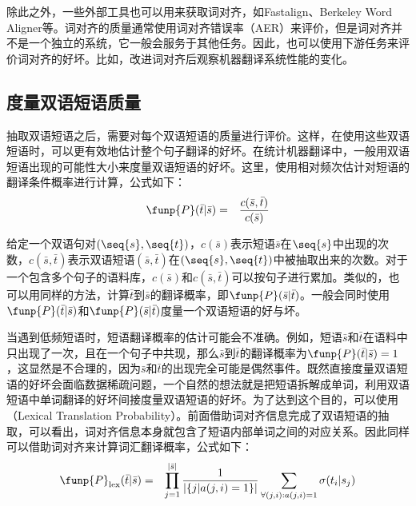 \parinterval 除此之外，一些外部工具也可以用来获取词对齐，如Fastalign、Berkeley Word Aligner等。词对齐的质量通常使用词对齐错误率（AER）来评价，但是词对齐并不是一个独立的系统，它一般会服务于其他任务。因此，也可以使用下游任务来评价词对齐的好坏。比如，改进词对齐后观察机器翻译系统性能的变化。


\subsection{度量双语短语质量}

\parinterval 抽取双语短语之后，需要对每个双语短语的质量进行评价。这样，在使用这些双语短语时，可以更有效地估计整个句子翻译的好坏。在统计机器翻译中，一般用双语短语出现的可能性大小来度量双语短语的好坏。这里，使用相对频次估计对短语的翻译条件概率进行计算，公式如下：
\begin{eqnarray}
\funp{P}(\bar{t}|\bar{s}) & = & \frac{c(\bar{s},\bar{t})}{c(\bar{s})}
\label{eq:7-13}
\end{eqnarray}

\parinterval 给定一个双语句对$(\seq{s},\seq{t})$，$c(\bar{s})$表示短语$\bar{s}$在$\seq{s}$中出现的次数，$c(\bar{s},\bar{t})$表示双语短语$(\bar{s},\bar{t})$在$(\seq{s},\seq{t})$中被抽取出来的次数。对于一个包含多个句子的语料库，$c(\bar{s})$和$c(\bar{s},\bar{t})$可以按句子进行累加。类似的，也可以用同样的方法，计算$\bar{t}$到$\bar{s}$的翻译概率，即$\funp{P}(\bar{s}|\bar{t})$。一般会同时使用$\funp{P}(\bar{t}|\bar{s})$和$\funp{P}(\bar{s}|\bar{t})$度量一个双语短语的好与坏。

\parinterval 当遇到低频短语时，短语翻译概率的估计可能会不准确。例如，短语$\bar{s}$和$\bar{t}$在语料中只出现了一次，且在一个句子中共现，那么$\bar{s}$到$\bar{t}$的翻译概率为$\funp{P}(\bar{t}|\bar{s})=1$，这显然是不合理的，因为$\bar{s}$和$\bar{t}$的出现完全可能是偶然事件。既然直接度量双语短语的好坏会面临数据稀疏问题，一个自然的想法就是把短语拆解成单词，利用双语短语中单词翻译的好坏间接度量双语短语的好坏。为了达到这个目的，可以使用{\small{}}（Lexical Translation Probability）。前面借助词对齐信息完成了双语短语的抽取，可以看出，词对齐信息本身就包含了短语内部单词之间的对应关系。因此同样可以借助词对齐来计算词汇翻译概率，公式如下：
\begin{eqnarray}
\funp{P}_{\textrm{lex}}(\bar{t}|\bar{s}) & = & \prod_{j=1}^{|\bar{s}|} \frac{1}{|\{j|a(j,i) = 1\}|} \sum_{\forall(j,i):a(j,i) = 1} \sigma (t_i|s_j)
\label{eq:7-14}
\end{eqnarray}

